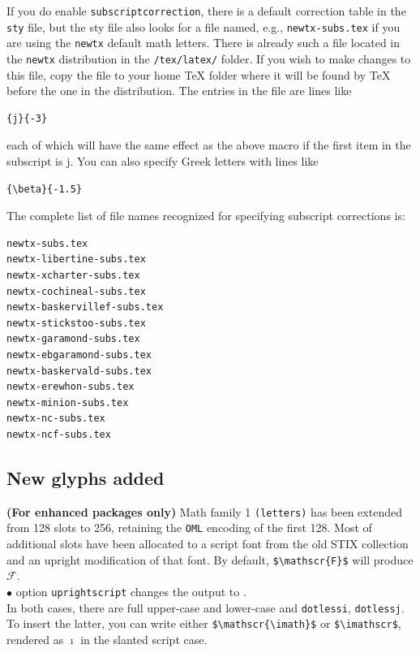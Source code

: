 \documentclass[11pt]{article}
\theoremstyle{oldplain}
\theoremstyle{plain}
\begin{document}
If you do enable {\tt subscriptcorrection}, there is a default correction table in the {\tt sty} file, but the sty file also looks for a file named, e.g., {\tt newtx-subs.tex} if you are using the {\tt newtx} default math letters. There is already such a file located in the {\tt newtx} distribution in the \verb|/tex/latex/| folder. If you wish to make changes to this file, copy the file to your home TeX folder where it will be found by TeX before the one in the distribution. The entries in the file are lines like
\begin{verbatim}
{j}{-3}
\end{verbatim}
each of which will have the same effect as the above macro if the first item in the subscript is j. You can also specify Greek letters with lines like
\begin{verbatim}
{\beta}{-1.5}
\end{verbatim}
The complete list of file names recognized for specifying subscript corrections is:
\begin{verbatim}
newtx-subs.tex
newtx-libertine-subs.tex
newtx-xcharter-subs.tex
newtx-cochineal-subs.tex
newtx-baskervillef-subs.tex
newtx-stickstoo-subs.tex
newtx-garamond-subs.tex
newtx-ebgaramond-subs.tex
newtx-baskervald-subs.tex
newtx-erewhon-subs.tex
newtx-minion-subs.tex
newtx-nc-subs.tex
newtx-ncf-subs.tex
\end{verbatim}

\subsection{New glyphs added} \textbf{(For enhanced packages only)} Math family 1 {\tt (letters)} has been extended from 128 slots to 256, retaining the {\tt OML} encoding of the first 128. Most of additional slots have been allocated to a script font from the old STIX collection and an upright modification of that font.
By default, \verb|$\mathscr{F}$| will produce $\mathscr{F}$.\\
$\bullet$ option {\tt uprightscript} changes the output to {}.\\
In both cases, there are full upper-case and lower-case and {\tt dotlessi}, {\tt dotlessj}. To insert the latter, you can write either \verb|$\mathscr{\imath}$| or \verb|$\imathscr$|, rendered as $\mathscr{\imath}$ in the slanted script case.
\end{document}
